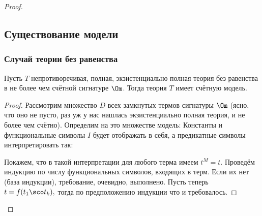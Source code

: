 \documentclass[a4paper,draft]{article}
\begin{document}
\begin{proof}
\subsection{Существование модели}
\subsubsection{Случай теории без равенства}
\begin{lemma}
Пусть $T$ непротиворечивая, полная, экзистенциально полная теория без равенства в не более чем счётной
сигнатуре $\Om$. Тогда теория $T$ имеет счётную модель.
\end{lemma}
\begin{proof}
Рассмотрим множество $D$ всех замкнутых термов сигнатуры $\Om$ (ясно, что оно не пусто, раз уж
у нас нашлась экзистенциально полная теория, и не более чем счётно).
Определим на это множестве модель: 
Константы и функциональные символы $I$ будет отображать в себя,
а предикатные символы интерпретировать так:

Покажем, что в такой интерпретации для любого терма имеем $t^M=t$.
Проведём индукцию по числу функциональных символов, входящих в терм.
Если их нет (база индукции), требование, очевидно, выполнено.
Пусть теперь $t=f(t_1\sco t_k),$ тогда по предположению индукции
что и требовалось.


\end{proof}
\end{proof}
\end{document}
